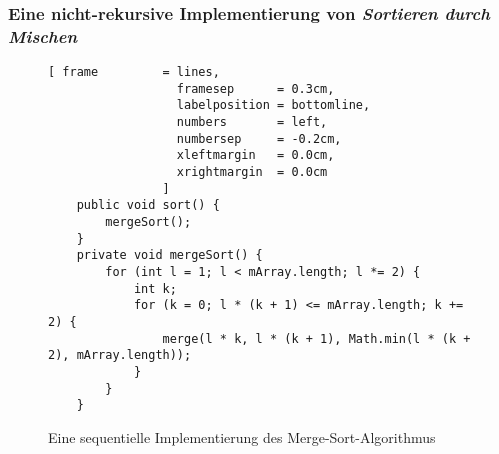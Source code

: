 \subsubsection{Eine nicht-rekursive Implementierung von \emph{Sortieren durch Mischen}}

\begin{figure}[!ht]
  \centering
\begin{Verbatim}[ frame         = lines, 
                  framesep      = 0.3cm, 
                  labelposition = bottomline,
                  numbers       = left,
                  numbersep     = -0.2cm,
                  xleftmargin   = 0.0cm,
                  xrightmargin  = 0.0cm
                ]
    public void sort() {
        mergeSort();
    }
    private void mergeSort() {
        for (int l = 1; l < mArray.length; l *= 2) {
            int k;
            for (k = 0; l * (k + 1) <= mArray.length; k += 2) {
                merge(l * k, l * (k + 1), Math.min(l * (k + 2), mArray.length));
            }
        }
    }
\end{Verbatim}
\vspace*{-0.3cm}
  \caption{Eine sequentielle Implementierung des Merge-Sort-Algorithmus}
  \label{fig:MergeSortNRAlgorithm.java}
\end{figure}

